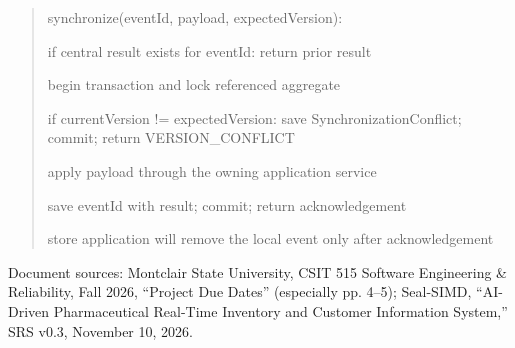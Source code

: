 \begin{quote}
synchronize(eventId, payload, expectedVersion):

if central result exists for eventId: return prior result

begin transaction and lock referenced aggregate

if currentVersion != expectedVersion: save SynchronizationConflict; commit; return VERSION\_CONFLICT

apply payload through the owning application service

save eventId with result; commit; return acknowledgement

store application will remove the local event only after acknowledgement
\end{quote}

Document sources: Montclair State University, CSIT 515 Software Engineering \& Reliability, Fall 2026, ``Project Due Dates'' (especially pp. 4--5); Seal-SIMD, ``AI-Driven Pharmaceutical Real-Time Inventory and Customer Information System,'' SRS v0.3, November 10, 2026.


